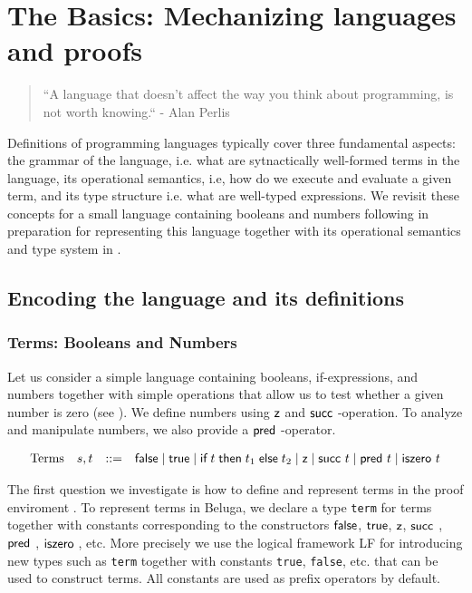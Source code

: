 \chapter{The Basics: Mechanizing languages and proofs}
\begin{quote}
``A language that doesn't affect the way you think about programming, is
not worth knowing.``
\hfill - Alan Perlis  
\end{quote}

Definitions of programming languages typically cover three fundamental
aspects: the grammar of the language, i.e. what are sytnactically well-formed
terms in the language, its operational semantics, i.e, how do we
execute and evaluate a given term, and its type structure i.e. what
are well-typed expressions. We revisit these concepts for a small
language containing booleans and numbers following \citep[Ch 3,Ch
8]{TAPL} in preparation for representing this language together with
its operational semantics and type system in \beluga.  

\section{Encoding the language and its definitions}
\subsection{Terms: Booleans and Numbers}
Let us consider a simple language containing booleans, if-expressions,
and numbers together with simple operations that allow us to test
whether a given number is zero (see \cite[Ch 3, Fig 3-1,Fig
3-2]{TAPL}). We define numbers using $\textsf{z}$ and
$\tmsucc$-operation. To analyze and manipulate numbers, we also
provide a $\tmpred$-operator.

\[
\begin{array}{llcl}
\mbox{Terms} & s,t & \mathrel{::=} & \textsf{false} \mid \textsf{true} \mid \textsf{if\;} t \textsf{\;then\;} t_1 \textsf{\;else\;} t_2 \mid
\textsf{z} \mid \textsf{succ}~t \mid \textsf{pred}~t \mid \textsf{iszero}~t
\end{array}
\]

The first question we investigate is how to define and represent terms
in the proof enviroment \beluga.  To represent terms in Beluga, we
declare a type \lstinline!term! for terms together with constants
corresponding to the constructors $\textsf{false}$, $\textsf{true}$, $\textsf{z}$,
$\tmsucc$, $\tmpred$, $\tmiszero$, etc. More precisely we use the logical framework
LF \citep{Harper93jacm} for introducing new types such as
\lstinline!term! together with constants \lstinline!true!,
\lstinline!false!, etc. that can be used to construct terms. All
constants are used as prefix operators by default.

